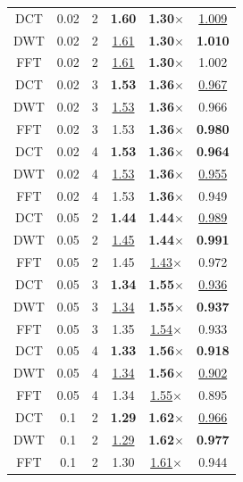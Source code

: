 \begin{table}[t!]
\begin{tiny}
\begin{tabular}{cccccc}
        \midrule
        DCT & 0.02 & 2 & \textbf{1.60} & \textbf{1.30$\times$} & \underline{1.009} \\
        DWT & 0.02 & 2 & \underline{1.61} & \textbf{1.30$\times$} & \textbf{1.010} \\
        FFT & 0.02 & 2 & \underline{1.61} & \textbf{1.30$\times$} & 1.002 \\
        \midrule
        DCT & 0.02 & 3 & \textbf{1.53} & \textbf{1.36$\times$} & \underline{0.967} \\
        DWT & 0.02 & 3 & \underline{1.53} & \textbf{1.36$\times$} & 0.966 \\
        FFT & 0.02 & 3 & 1.53 & \textbf{1.36$\times$} & \textbf{0.980} \\
        \midrule
        DCT & 0.02 & 4 & \textbf{1.53} & \textbf{1.36$\times$} & \textbf{0.964} \\
        DWT & 0.02 & 4 & \underline{1.53} & \textbf{1.36$\times$} & \underline{0.955} \\
        FFT & 0.02 & 4 & 1.53 & \textbf{1.36$\times$} & 0.949 \\
        \midrule
        DCT & 0.05 & 2 & \textbf{1.44} & \textbf{1.44$\times$} & \underline{0.989} \\
        DWT & 0.05 & 2 & \underline{1.45} & \textbf{1.44$\times$} & \textbf{0.991} \\
        FFT & 0.05 & 2 & 1.45 & \underline{1.43$\times$} & 0.972 \\
        \midrule
        DCT & 0.05 & 3 & \textbf{1.34} & \textbf{1.55$\times$} & \underline{0.936} \\
        DWT & 0.05 & 3 & \underline{1.34} & \textbf{1.55$\times$} & \textbf{0.937} \\
        FFT & 0.05 & 3 & 1.35 & \underline{1.54$\times$} & 0.933 \\
        \midrule
        DCT & 0.05 & 4 & \textbf{1.33} & \textbf{1.56$\times$} & \textbf{0.918} \\
        DWT & 0.05 & 4 & \underline{1.34} & \textbf{1.56$\times$} & \underline{0.902} \\
        FFT & 0.05 & 4 & 1.34 & \underline{1.55$\times$} & 0.895 \\
        \midrule
        DCT & 0.1 & 2 & \textbf{1.29} & \textbf{1.62$\times$} & \underline{0.966} \\
        DWT & 0.1 & 2 & \underline{1.29} & \textbf{1.62$\times$} & \textbf{0.977} \\
        FFT & 0.1 & 2 & 1.30 & \underline{1.61$\times$} & 0.944 \\

\end{tabular}
\end{tiny}
\end{table}
